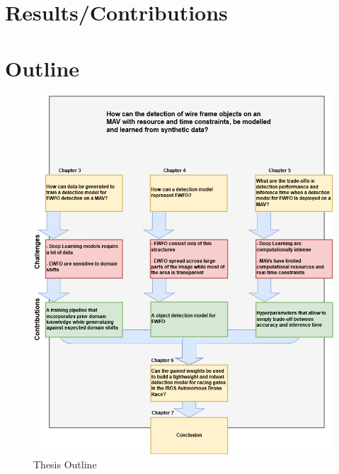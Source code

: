 \section{Results/Contributions}


\section{Outline}

\begin{figure}[hbtp]
	\centering
	\includegraphics[width=\textwidth]{fig/outline}
	\caption{Thesis Outline}
	\label{fig:outline}
\end{figure}


